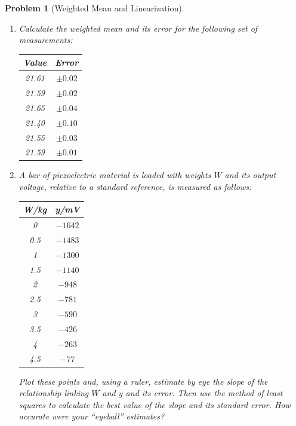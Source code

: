 \documentclass[a4paper]{article}
\theoremstyle{new}
\newtheorem{qns}{Problem}[section]
\begin{document}
\newpage
\begin{qns}[Weighted Mean and Linearization]\leavevmode
\begin{enumerate}[label=(\alph*)]
\item Calculate the weighted mean and its error for the following set of measurements:
\begin{center}
\begin{tabular}{|c|c|}
\hline
Value & Error\\
\hline
21.61 & $\pm0.02$\\
21.59 & $\pm0.02$\\
21.65 & $\pm0.04$\\
21.40 & $\pm0.10$\\
21.55 & $\pm0.03$\\
21.59 & $\pm0.01$\\
\hline
\end{tabular}
\end{center}
\item A bar of piezoelectric material is loaded with weights $W$ and its output voltage, relative to a standard reference, is measured as follows:
\begin{center}
\begin{tabular}{|c|c|}
\hline
W/kg & y/mV\\
\hline
0 & $-1642$\\
0.5 & $-1483$\\
1 & $-1300$\\
1.5 & $-1140$\\
2 & $-948$\\
2.5 & $-781$\\
3 & $-590$\\
3.5 & $-426$\\
4 & $-263$\\
4.5 & $-77$\\
\hline
\end{tabular}
\end{center}
Plot these points and, using a ruler, estimate by eye the slope of the relationship linking $W$ and $y$ and its error. Then use the method of least squares to calculate the best value of the slope and its standard error. How accurate were your “eyeball” estimates?
\end{enumerate}
\end{qns}
\end{document}
